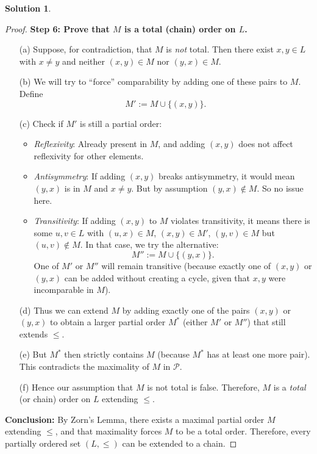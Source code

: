 \documentclass[12pt]{article}
\theoremstyle{definition} %
\newtheorem{solution}{Solution}
\theoremstyle{plain} %
\begin{document}
\begin{solution}
\begin{proof}
        \vspace{0.3cm}
        \textbf{Step 6: Prove that $M$ is a total (chain) order on $L$.}
        
        \begin{enumerate}
            \item[(a)] Suppose, for contradiction, that $M$ is \emph{not} total. Then there exist $x,y \in L$ with $x \neq y$ and neither $(x,y)\in M$ nor $(y,x)\in M$.
            \item[(b)] We will try to ``force'' comparability by adding one of these pairs to $M$. Define
            \[
               M' := M \cup \{(x,y)\}.
            \]
            \item[(c)] Check if $M'$ is still a partial order:
            \begin{itemize}
                \item \emph{Reflexivity}: Already present in $M$, and adding $(x,y)$ does not affect reflexivity for other elements.
                \item \emph{Antisymmetry}: If adding $(x,y)$ breaks antisymmetry, it would mean $(y,x)$ is in $M$ and $x\neq y$. But by assumption $(y,x)\notin M$. So no issue here.
                \item \emph{Transitivity}: If adding $(x,y)$ to $M$ violates transitivity, it means there is some $u,v \in L$ with $(u,x)\in M$, $(x,y)\in M'$, $(y,v)\in M$ but $(u,v)\notin M$. In that case, we try the alternative:
                \[
                    M'' := M \cup \{(y,x)\}.
                \]
                One of $M'$ or $M''$ will remain transitive (because exactly one of $(x,y)$ or $(y,x)$ can be added without creating a cycle, given that $x,y$ were incomparable in $M$).
            \end{itemize}
            \item[(d)] Thus we can extend $M$ by adding exactly one of the pairs $(x,y)$ or $(y,x)$ to obtain a larger partial order $M^*$ (either $M'$ or $M''$) that still extends $\leq$.
            \item[(e)] But $M^*$ then strictly contains $M$ (because $M^*$ has at least one more pair). This contradicts the maximality of $M$ in $\mathcal{P}$.
            \item[(f)] Hence our assumption that $M$ is not total is false. Therefore, $M$ is a \emph{total} (or chain) order on $L$ extending $\leq$.
        \end{enumerate}
        
        \vspace{0.3cm}
        \noindent
        \textbf{Conclusion:} By Zorn's Lemma, there exists a maximal partial order $M$ extending $\leq$, and that maximality forces $M$ to be a total order. Therefore, every partially ordered set $(L,\leq)$ can be extended to a chain.
        
        \end{proof}

\end{solution}
\end{document}
